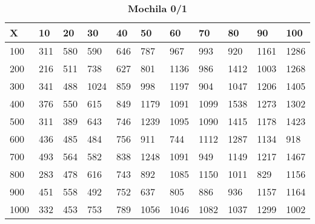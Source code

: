 \documentclass[10pt,letterpaper]{article}
\begin{document}
\newpage 
{}
\begin{center}
\begin{table}\renewcommand{\arraystretch}{2.5}
\caption{\large \textbf{Mochila 0/1}}
\centering
\begin{tabular} { |m{0.5cm}|m{1.3cm}|m{1.3cm}|m{1.3cm}|m{1.3cm}|m{1.3cm}|m{1.3cm}|m{1.3cm}|m{1.3cm}|m{1.3cm}|m{1.3cm}|} 
\hline
\rowcolor{Gray}
\centering \textbf{X} & \centering \textbf{10} & \centering \textbf{20} & \centering \textbf{30}\ & \centering \textbf{40} & \centering \textbf{50} & \centering \textbf{60}\ & \centering \textbf{70} & \centering \textbf{80} & \centering \textbf{90}\ & \textbf{100} \\\hline
\cellcolor{Gray}100 & \Large 311 & \Large 580 & \Large 590 & \Large 646 & \Large 787 & \Large 967 & \Large 993 & \Large 920 & \Large 1161 & \Large 1286 \\
\hline
\cellcolor{Gray}200 & \Large 216 & \Large 511 & \Large 738 & \Large 627 & \Large 801 & \Large 1136 & \Large 986 & \Large 1412 & \Large 1003 & \Large 1268 \\
\hline
\cellcolor{Gray}300 & \Large 341 & \Large 488 & \Large 1024 & \Large 859 & \Large 998 & \Large 1197 & \Large 904 & \Large 1047 & \Large 1206 & \Large 1405 \\
\hline
\cellcolor{Gray}400 & \Large 376 & \Large 550 & \Large 615 & \Large 849 & \Large 1179 & \Large 1091 & \Large 1099 & \Large 1538 & \Large 1273 & \Large 1302 \\
\hline
\cellcolor{Gray}500 & \Large 311 & \Large 389 & \Large 643 & \Large 746 & \Large 1239 & \Large 1095 & \Large 1090 & \Large 1415 & \Large 1178 & \Large 1423 \\
\hline
\cellcolor{Gray}600 & \Large 436 & \Large 485 & \Large 484 & \Large 756 & \Large 911 & \Large 744 & \Large 1112 & \Large 1287 & \Large 1134 & \Large 918 \\
\hline
\cellcolor{Gray}700 & \Large 493 & \Large 564 & \Large 582 & \Large 838 & \Large 1248 & \Large 1091 & \Large 949 & \Large 1149 & \Large 1217 & \Large 1467 \\
\hline
\cellcolor{Gray}800 & \Large 283 & \Large 478 & \Large 616 & \Large 743 & \Large 892 & \Large 1085 & \Large 1150 & \Large 1011 & \Large 829 & \Large 1156 \\
\hline
\cellcolor{Gray}900 & \Large 451 & \Large 558 & \Large 492 & \Large 752 & \Large 637 & \Large 805 & \Large 886 & \Large 936 & \Large 1157 & \Large 1164 \\
\hline
\cellcolor{Gray}1000 & \Large 332 & \Large 453 & \Large 753 & \Large 789 & \Large 1056 & \Large 1046 & \Large 1082 & \Large 1037 & \Large 1299 & \Large 1002 \\
\hline
\end{tabular} \\
\end{table}
\end{center}
\end{document}
